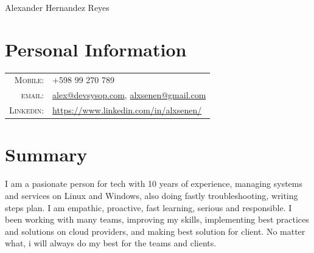 \documentclass[a4paper,12pt]{article}
\begin{document}
\vspace*{-0.5cm}

\pagestyle{empty} %

{\huge Alexander Hernandez Reyes}
\hfill
{}\\
\section{Personal Information}
\begin{tabular}{rl}
    \textsc{Mobile:}    & +598 99 270 789 \\
    \textsc{email:}     & \href{mailto:alex@devsysop.com}{alex@devsysop.com}, \href{mailto:alxsenen@gmail.com}{alxsenen@gmail.com} \\
    \textsc{Linkedin:}  & \href{https://www.linkedin.com/in/alxsenen/}{https://www.linkedin.com/in/alxsenen/} \\
\end{tabular}

\section{Summary}
\justify
I am a pasionate person for tech with 10 years of experience, managing systems and services on Linux and Windows, also doing fastly troubleshooting, writing steps plan. I am empathic, proactive, fast learning, serious and responsible.
I been working with many teams, improving my skills, implementing best practices and solutions on cloud providers, and making best solution for client. No matter what, i will always do my best for the teams and clients.

\end{document}
